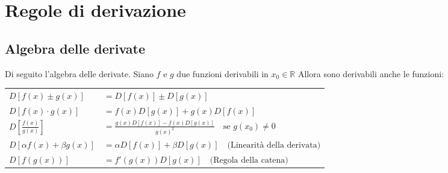 \documentclass{book}
\begin{document}
\section{Regole di derivazione}
\begin{theorem}
    \subsection{Algebra delle derivate}
    Di seguito l'algebra delle derivate.
    Siano $f$ e $g$ due funzioni derivabili in $x_0 \in \mathbb{R}$
    Allora sono derivabili anche le funzioni:
    \begin{center}
        \renewcommand{\arraystretch}{2} %
        \begin{tabular}{l l}
            $D[f(x) \pm g(x)]                $               & $ = D[f(x)] \pm D[g(x)]                                                     $                 \\
            $D[f(x) \cdot g(x)]              $               & $ = f(x)D[g(x)] + g(x)D[f(x)]                                               $                 \\
            $D\left[\displaystyle \frac{f(x)}{g(x)}\right] $ & $ = \displaystyle \frac{g(x)D[f(x)] - f(x)D[g(x)]}{g(x)^2} \quad \text{se } g(x_0) \neq 0 $   \\
            $D[\alpha f(x) + \beta g(x)]                 $   & $ = \alpha D[f(x)] + \beta D[g(x)] \quad \text{(Linearità della derivata)}                  $ \\
            $D[f(g(x))]                      $               & $ = f'(g(x))D[g(x)] \quad \text{(Regola della catena)}$                                       \\
        \end{tabular}
    \end{center}
\end{theorem}
\end{document}
